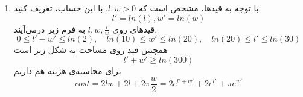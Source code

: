 \begin{enumerate}
	\item 
با توجه به قید‌ها، مشخص است که 
$l, w > 0$.
با این حساب، تعریف کنید
	\[
	l' = ln(l), w' = ln(w)
	\]
قید‌های روی 
$l, w, \frac{l}{w}$
به فرم زیر درمی‌آیند.
	\[
0 \le	l' - w' \le ln(2), \quad ln(10) \le w' \le ln(20), \quad ln(20) \le l' \le ln(30)
	\]
	همچنین قید روی مساحت به شکل زیر است
	\[
	l' + w' \ge ln(300)
	\]
	برای محاسبه‌ی هزینه هم داریم
	\[
	cost = 2lw + 2l + 2\pi\frac{w}{2} = 2e^{l' + w'} + 2e^{l'} + \pi e^{w'}
	\]
\end{enumerate}